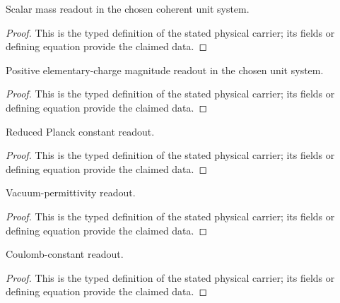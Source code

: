 \begin{definition}
  \label{def:physics:IPhO_2026_1_B_2:aux011}
  Scalar mass readout in the chosen coherent unit system.
\end{definition}
\begin{proof}
  This is the typed definition of the stated physical carrier; its fields or defining equation provide the claimed data.
\end{proof}

\begin{definition}
  \label{def:physics:IPhO_2026_1_B_2:aux012}
  Positive elementary-charge magnitude readout in the chosen unit system.
\end{definition}
\begin{proof}
  This is the typed definition of the stated physical carrier; its fields or defining equation provide the claimed data.
\end{proof}

\begin{definition}
  \label{def:physics:IPhO_2026_1_B_2:aux013}
  Reduced Planck constant readout.
\end{definition}
\begin{proof}
  This is the typed definition of the stated physical carrier; its fields or defining equation provide the claimed data.
\end{proof}

\begin{definition}
  \label{def:physics:IPhO_2026_1_B_2:aux014}
  Vacuum-permittivity readout.
\end{definition}
\begin{proof}
  This is the typed definition of the stated physical carrier; its fields or defining equation provide the claimed data.
\end{proof}

\begin{definition}
  \label{def:physics:IPhO_2026_1_B_2:aux015}
  Coulomb-constant readout.
\end{definition}
\begin{proof}
  This is the typed definition of the stated physical carrier; its fields or defining equation provide the claimed data.
\end{proof}

